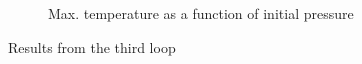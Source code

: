 \documentclass[a4paper]{article}
\begin{document}
\begin{figure}[H]
\begin{subfigure}[h]{0.4\textwidth}
        	\caption{Max. temperature as a function of initial pressure}
        \label{fig:3_2}
    \end{subfigure}
    \caption{Results from the third loop}\label{fig:3}
\end{figure}




\end{document}
